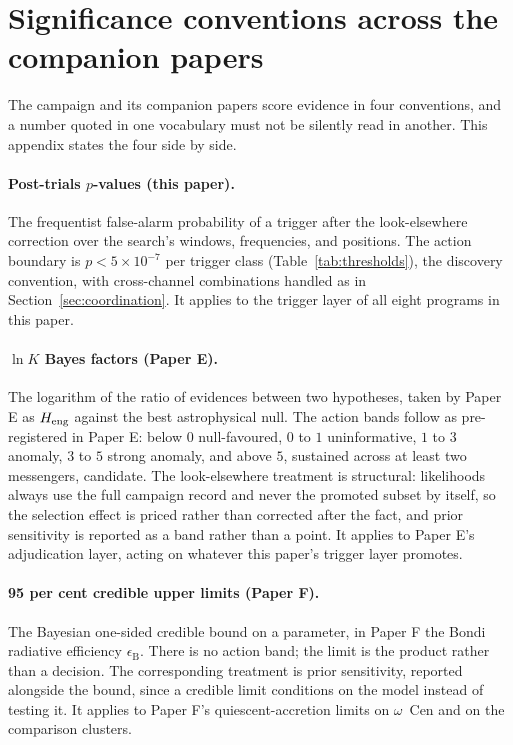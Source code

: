\documentclass[11pt]{article}
\newcommand{\ocen}{\ensuremath{\omega}~Cen}
\begin{document}
\section{Significance conventions across the companion papers}
\label{app:conventions}

The campaign and its companion papers score evidence in four conventions, and a number quoted in one vocabulary must not be silently read in another. This appendix states the four side by side.

\paragraph{Post-trials $p$-values (this paper).} The frequentist false-alarm probability of a trigger after the look-elsewhere correction over the search's windows, frequencies, and positions. The action boundary is $p < 5\times10^{-7}$ per trigger class (Table~\ref{tab:thresholds}), the discovery convention, with cross-channel combinations handled as in Section~\ref{sec:coordination}. It applies to the trigger layer of all eight programs in this paper.

\paragraph{$\ln K$ Bayes factors (Paper E).} The logarithm of the ratio of evidences between two hypotheses, taken by Paper E as $H_{\rm eng}$ against the best astrophysical null. The action bands follow \citet{Kass1995} as pre-registered in Paper E: below $0$ null-favoured, $0$ to $1$ uninformative, $1$ to $3$ anomaly, $3$ to $5$ strong anomaly, and above $5$, sustained across at least two messengers, candidate. The look-elsewhere treatment is structural: likelihoods always use the full campaign record and never the promoted subset by itself, so the selection effect is priced rather than corrected after the fact, and prior sensitivity is reported as a band rather than a point. It applies to Paper E's adjudication layer, acting on whatever this paper's trigger layer promotes.

\paragraph{95 per cent credible upper limits (Paper F).} The Bayesian one-sided credible bound on a parameter, in Paper F the Bondi radiative efficiency $\epsilon_{\mathrm{B}}$. There is no action band; the limit is the product rather than a decision. The corresponding treatment is prior sensitivity, reported alongside the bound, since a credible limit conditions on the model instead of testing it. It applies to Paper F's quiescent-accretion limits on \ocen{} and on the comparison clusters.
\end{document}
